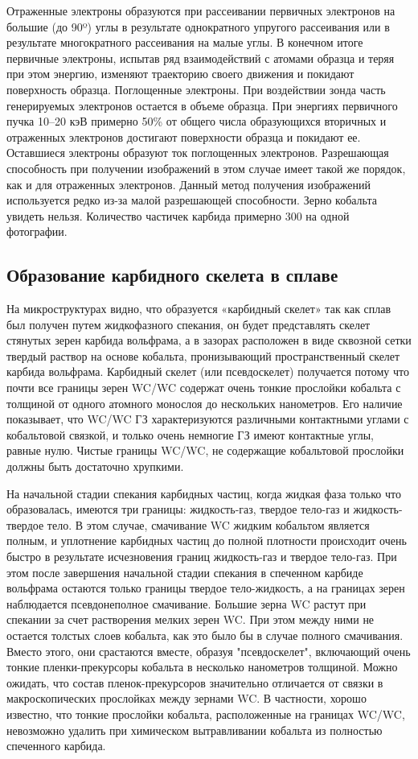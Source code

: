 \documentclass[a4paper, 14pt]{article}
\begin{document}
	Отраженные электроны образуются при рассеивании первичных электронов на большие (до 90º) углы в результате однократного упругого рассеивания или в результате многократного рассеивания на малые углы. В конечном итоге первичные электроны, испытав ряд взаимодействий с атомами образца и теряя при этом энергию, изменяют траекторию своего движения и покидают поверхность образца. Поглощенные электроны. При воздействии зонда часть генерируемых электронов остается в объеме образца. При энергиях первичного пучка 10–20 кэВ примерно 50\% от общего числа образующихся вторичных и отраженных электронов достигают поверхности образца и покидают ее. Оставшиеся электроны образуют ток поглощенных электронов. Разрешающая способность при получении изображений в этом случае имеет такой же порядок, как и для отраженных электронов. Данный метод получения изображений используется редко из-за малой разрешающей способности. Зерно кобальта увидеть нельзя. Количество частичек карбида примерно 300 на одной фотографии.
	
	\subsection{Образование карбидного скелета в сплаве}
	На микроструктурах видно, что образуется «карбидный скелет» так как сплав был получен путем жидкофазного спекания, он будет представлять скелет стянутых зерен карбида вольфрама, а в зазорах расположен в виде сквозной сетки твердый раствор на основе кобальта, пронизывающий пространственный скелет карбида вольфрама. Карбидный скелет (или псевдоскелет) получается потому что почти все границы зерен WC/WC содержат очень тонкие прослойки кобальта с толщиной от одного атомного монослоя до нескольких нанометров. Его наличие показывает, что WC/WC ГЗ характеризуются различными контактными углами с кобальтовой связкой, и только очень
	немногие ГЗ имеют контактные углы, равные нулю. Чистые границы WC/WC, не содержащие кобальтовой прослойки должны быть достаточно хрупкими. 
	
	На начальной стадии спекания карбидных частиц, когда жидкая фаза только что образовалась, имеются три границы: жидкость-газ, твердое тело-газ и жидкость-твердое тело. В этом случае, смачивание WC жидким кобальтом является полным, и уплотнение карбидных частиц до полной плотности происходит очень быстро в результате исчезновения границ жидкость-газ и твердое тело-газ. При этом после завершения начальной стадии спекания в спеченном карбиде вольфрама остаются только границы твердое тело-жидкость, а на границах зерен наблюдается псевдонеполное смачивание. Большие зерна WC растут при  спекании за счет растворения мелких зерен WC. При этом между ними не остается толстых слоев кобальта, как это было бы в случае полного смачивания. Вместо этого, они срастаются вместе, образуя "псевдоскелет", включающий очень тонкие пленки-прекурсоры кобальта в несколько нанометров толщиной. Можно ожидать, что состав пленок-прекурсоров значительно отличается от связки в макроскопических прослойках между зернами WC. В частности, хорошо известно, что тонкие прослойки кобальта, расположенные на границах WC/WC, невозможно удалить при химическом вытравливании кобальта из полностью спеченного карбида.
\end{document}
